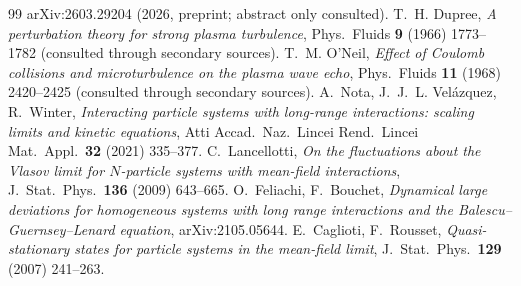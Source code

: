\documentclass[11pt]{article}
\theoremstyle{definition}
\begin{document}
\begin{thebibliography}{99}
arXiv:2603.29204 (2026, preprint; abstract only consulted).
 T.~H. Dupree, \emph{A perturbation theory for strong plasma
turbulence}, Phys.\ Fluids \textbf{9} (1966) 1773--1782 (consulted through
secondary sources).
 T.~M. O'Neil, \emph{Effect of Coulomb collisions and
microturbulence on the plasma wave echo}, Phys.\ Fluids \textbf{11} (1968)
2420--2425 (consulted through secondary sources).
 A.~Nota, J.~J.~L. Vel\'azquez, R.~Winter, \emph{Interacting
particle systems with long-range interactions: scaling limits and kinetic
equations}, Atti Accad.\ Naz.\ Lincei Rend.\ Lincei Mat.\ Appl.\ \textbf{32}
(2021) 335--377.
 C.~Lancellotti, \emph{On the fluctuations about the
Vlasov limit for $N$-particle systems with mean-field interactions}, J.\
Stat.\ Phys.\ \textbf{136} (2009) 643--665.
 O.~Feliachi, F.~Bouchet, \emph{Dynamical large
deviations for homogeneous systems with long range interactions and the
Balescu--Guernsey--Lenard equation}, arXiv:2105.05644.
 E.~Caglioti, F.~Rousset, \emph{Quasi-stationary
states for particle systems in the mean-field limit}, J.\ Stat.\ Phys.\
\textbf{129} (2007) 241--263.
\end{thebibliography}
\end{document}
